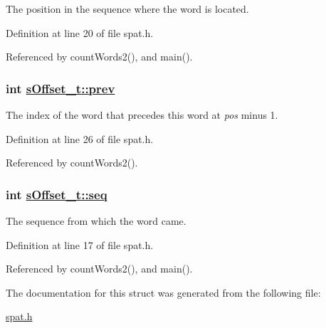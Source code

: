 The position in the sequence where the word is located.

Definition at line 20 of file spat.h.

Referenced by count\-Words2(), and main().\hypertarget{structsOffset__t_o3}{
\subsubsection[prev]{\setlength{\rightskip}{0pt plus 5cm}int \hyperlink{structsOffset__t_o3}{s\-Offset\_\-t::prev}}}
\label{structsOffset__t_o3}


The index of the word that precedes this word at {\em pos\/} minus 1.

Definition at line 26 of file spat.h.

Referenced by count\-Words2().\hypertarget{structsOffset__t_o0}{
\subsubsection[seq]{\setlength{\rightskip}{0pt plus 5cm}int \hyperlink{structsOffset__t_o0}{s\-Offset\_\-t::seq}}}
\label{structsOffset__t_o0}


The sequence from which the word came.

Definition at line 17 of file spat.h.

Referenced by count\-Words2(), and main().

The documentation for this struct was generated from the following file:\begin{CompactItemize}
\item 
\hyperlink{spat_8h}{spat.h}\end{CompactItemize}
